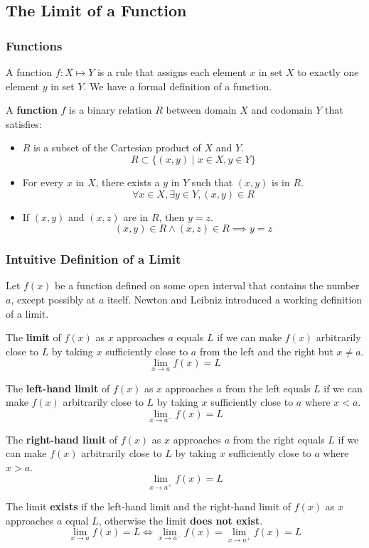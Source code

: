 \subsection{The Limit of a Function}

\subsubsection{Functions}
A function \(f:X\mapsto Y\) is a rule that assigns each element \(x\) in set
\(X\) to exactly one element \(y\) in set \(Y\).
We have a formal definition of a function.
\begin{definition}
    A \textbf{function} \(f\) is a binary relation \(R\) between domain \(X\)
    and codomain \(Y\) that satisfies:
    \begin{itemize}
        \item \(R\) is a subset of the Cartesian product of \(X\) and \(Y\).
        \[R\subset\{(x,y)\mid x\in X,y\in Y\}\]
        \item For every \(x\) in \(X\), there exists a \(y\) in \(Y\) such
        that \((x,y)\) is in \(R\).
        \[\forall x\in X,\exists y\in Y,(x,y)\in R\]
        \item If \((x,y)\) and \((x,z)\) are in \(R\), then \(y=z\).
        \[(x,y)\in R \wedge (x,z)\in R \implies y=z\]
    \end{itemize}
\end{definition}

\subsubsection{Intuitive Definition of a Limit}
Let \(f(x)\) be a function defined on some open interval that contains the
number \(a\), except possibly at \(a\) itself.
Newton and Leibniz introduced a working definition of a limit.
\begin{definition}
    The \textbf{limit} of \(f(x)\) as \(x\) approaches \(a\) equals \(L\) if
    we can make \(f(x)\) arbitrarily close to \(L\) by taking \(x\)
    sufficiently close to \(a\) from the left and the right but \(x\neq a\).
    \[\lim_{x\to a}f(x)=L\]
\end{definition}
\begin{definition}
    The \textbf{left-hand limit} of \(f(x)\) as \(x\) approaches \(a\) from
    the left equals \(L\) if we can make \(f(x)\) arbitrarily close to \(L\)
    by taking \(x\) sufficiently close to \(a\) where \(x<a\).
    \[\lim_{x\to a^-}f(x)=L\]
\end{definition}
\begin{definition}
    The \textbf{right-hand limit} of \(f(x)\) as \(x\) approaches \(a\) from
    the right equals \(L\) if we can make \(f(x)\) arbitrarily close to \(L\)
    by taking \(x\) sufficiently close to \(a\) where \(x>a\).
    \[\lim_{x\to a^+}f(x)=L\]
\end{definition}
The limit \textbf{exists} if the left-hand limit and the right-hand limit of
\(f(x)\) as \(x\) approaches \(a\) equal \(L\), otherwise the limit
\textbf{does not exist}.
\[\lim_{x\to a}f(x)=L\iff \lim_{x\to a^-}f(x)=\lim_{x\to a^+}f(x)=L\]